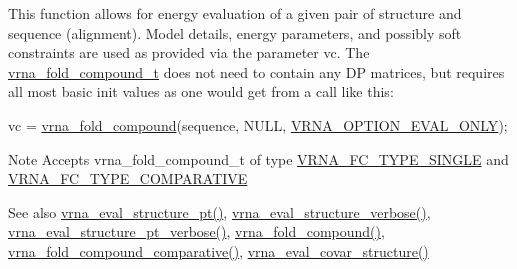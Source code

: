 This function allows for energy evaluation of a given pair of structure and sequence (alignment). Model details, energy parameters, and possibly soft constraints are used as provided via the parameter \textquotesingle{}vc\textquotesingle{}. The \mbox{\hyperlink{group__fold__compound_ga1b0cef17fd40466cef5968eaeeff6166}{vrna\+\_\+fold\+\_\+compound\+\_\+t}} does not need to contain any DP matrices, but requires all most basic init values as one would get from a call like this\+: 
\begin{DoxyCode}
vc = \mbox{\hyperlink{group__fold__compound_ga6601d994ba32b11511b36f68b08403be}{vrna\_fold\_compound}}(sequence, NULL, \mbox{\hyperlink{group__fold__compound_ga61469c423131552c8483229f8b6c7e0e}{VRNA\_OPTION\_EVAL\_ONLY}});
\end{DoxyCode}


\begin{DoxyNote}{Note}
Accepts vrna\+\_\+fold\+\_\+compound\+\_\+t of type \mbox{\hyperlink{group__fold__compound_gga01a4ff86fa71deaaa5d1abbd95a1447da7e264dd3cf2dc9b6448caabcb7763cd6}{V\+R\+N\+A\+\_\+\+F\+C\+\_\+\+T\+Y\+P\+E\+\_\+\+S\+I\+N\+G\+LE}} and \mbox{\hyperlink{group__fold__compound_gga01a4ff86fa71deaaa5d1abbd95a1447dab821ce46ea3cf665be97df22a76f5023}{V\+R\+N\+A\+\_\+\+F\+C\+\_\+\+T\+Y\+P\+E\+\_\+\+C\+O\+M\+P\+A\+R\+A\+T\+I\+VE}}
\end{DoxyNote}
\begin{DoxySeeAlso}{See also}
\mbox{\hyperlink{group__eval_gadbd09372ddfd7a450bbd590c96a6bfe4}{vrna\+\_\+eval\+\_\+structure\+\_\+pt()}}, \mbox{\hyperlink{group__eval_ga0928d699d310178f84ee2351034e5cb5}{vrna\+\_\+eval\+\_\+structure\+\_\+verbose()}}, \mbox{\hyperlink{group__eval_ga8a517cfeeae8c376ae7b1e0c401d38b4}{vrna\+\_\+eval\+\_\+structure\+\_\+pt\+\_\+verbose()}}, \mbox{\hyperlink{group__fold__compound_ga6601d994ba32b11511b36f68b08403be}{vrna\+\_\+fold\+\_\+compound()}}, \mbox{\hyperlink{group__fold__compound_gad6bacc816af274922b13d947f708aa0c}{vrna\+\_\+fold\+\_\+compound\+\_\+comparative()}}, \mbox{\hyperlink{group__eval_ga6cea75c0eb9857fb59172be54cab09e0}{vrna\+\_\+eval\+\_\+covar\+\_\+structure()}}
\end{DoxySeeAlso}

